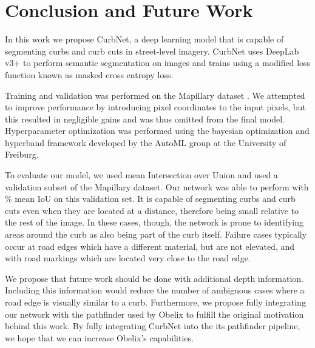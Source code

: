 \chapter{Conclusion and Future Work}\label{chap:conclusion}
In this work we propose CurbNet, a deep learning model that is capable of segmenting curbs and curb cuts in street-level imagery.
CurbNet uses DeepLab v3+ to perform semantic segmentation on images and trains using a modified loss function known as masked cross entropy loss.

Training and validation was performed on the Mapillary dataset \cite{mapillary}.
We attempted to improve performance by introducing pixel coordinates to the input pixels, but this resulted in negligible gains and was thus omitted from the final model.
Hyperparameter optimization was performed using the bayesian optimization and hyperband framework developed by the AutoML group at the University of Freiburg.

To evaluate our model, we used mean Intersection over Union and used a validation subset of the Mapillary dataset.
Our network was able to perform with \% mean IoU on this validation set.
It is capable of segmenting curbs and curb cuts even when they are located at a distance, therefore being small relative to the rest of the image.
In these cases, though, the network is prone to identifying areas around the curb as also being part of the curb itself.
Failure cases typically occur at road edges which have a different material, but are not elevated, and with road markings which are located very close to the road edge.

We propose that future work should be done with additional depth information.
Including this information would reduce the number of ambiguous cases where a road edge is visually similar to a curb.
Furthermore, we propose fully integrating our network with the pathfinder used by Obelix to fulfill the original motivation behind this work.
By fully integrating CurbNet into the its pathfinder pipeline, we hope that we can increase Obelix's capabilities.